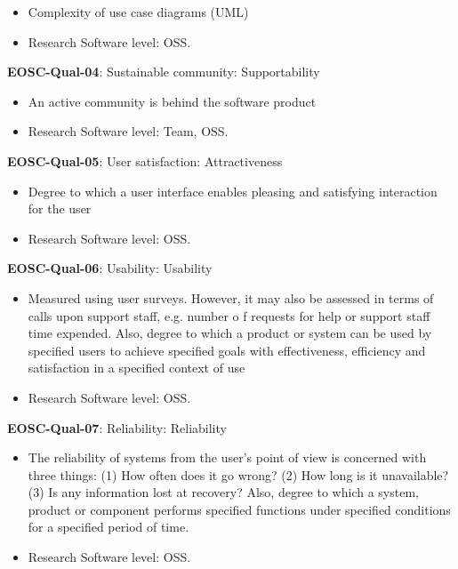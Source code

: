 \begin{itemize}
    \item Complexity of use case diagrams (UML) \cite{montagud_systematic_2012}
    \item Research Software level: OSS.
\end{itemize}

\textbf{EOSC-Qual-04}: Sustainable community: Supportability

\begin{itemize}
    \item An active community is behind the software product \cite{aberdour_achieving_2007}
    \item Research Software level: Team, OSS.
\end{itemize}

\textbf{EOSC-Qual-05}: User satisfaction: Attractiveness

\begin{itemize}
    \item Degree to which a user interface enables pleasing and satisfying interaction for the user \cite{iso_25010_2011_2017,zuser_software_2005}
    \item Research Software level: OSS.
\end{itemize}

\textbf{EOSC-Qual-06}: Usability: Usability

\begin{itemize}
    \item Measured using user surveys. However, it may also be assessed in terms of calls upon support staff, e.g. number o f requests for help or support staff time expended. Also, degree to which a product or system can be used by specified users to achieve specified goals with
effectiveness, efficiency and satisfaction in a specified context of use \cite{iso_25010_2011_2017,zuser_software_2005,gillies_modelling_1992,boehm_quantitative_1976}
    \item Research Software level: OSS.
\end{itemize}

\textbf{EOSC-Qual-07}: Reliability: Reliability

\begin{itemize}
    \item The reliability of systems from the user's point of view is concerned with three things: (1) How often does it go wrong? (2) How long is it unavailable? (3) Is any information lost at recovery? Also, degree to which a system, product or component performs specified functions under specified conditions for a
specified period of time. \cite{iso_25010_2011_2017,gillies_modelling_1992,boehm_quantitative_1976}
    \item Research Software level: OSS.
\end{itemize}

